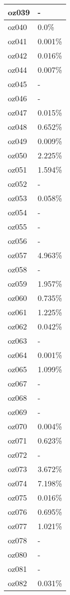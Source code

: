 \documentclass{article}%
\begin{document}
\begin{longtabu}{X[l] X[r]}
\hline%
oz039&{-}\\%
\hline%
oz040&0.0\%\\%
\hline%
oz041&0.001\%\\%
\hline%
oz042&0.016\%\\%
\hline%
oz044&0.007\%\\%
\hline%
oz045&{-}\\%
\hline%
oz046&{-}\\%
\hline%
oz047&0.015\%\\%
\hline%
oz048&0.652\%\\%
\hline%
oz049&0.009\%\\%
\hline%
oz050&2.225\%\\%
\hline%
oz051&1.594\%\\%
\hline%
oz052&{-}\\%
\hline%
oz053&0.058\%\\%
\hline%
oz054&{-}\\%
\hline%
oz055&{-}\\%
\hline%
oz056&{-}\\%
\hline%
oz057&4.963\%\\%
\hline%
oz058&{-}\\%
\hline%
oz059&1.957\%\\%
\hline%
oz060&0.735\%\\%
\hline%
oz061&1.225\%\\%
\hline%
oz062&0.042\%\\%
\hline%
oz063&{-}\\%
\hline%
oz064&0.001\%\\%
\hline%
oz065&1.099\%\\%
\hline%
oz067&{-}\\%
\hline%
oz068&{-}\\%
\hline%
oz069&{-}\\%
\hline%
oz070&0.004\%\\%
\hline%
oz071&0.623\%\\%
\hline%
oz072&{-}\\%
\hline%
oz073&3.672\%\\%
\hline%
oz074&7.198\%\\%
\hline%
oz075&0.016\%\\%
\hline%
oz076&0.695\%\\%
\hline%
oz077&1.021\%\\%
\hline%
oz078&{-}\\%
\hline%
oz080&{-}\\%
\hline%
oz081&{-}\\%
\hline%
oz082&0.031\%\\%
\hline%

\end{longtabu}
\end{document}
